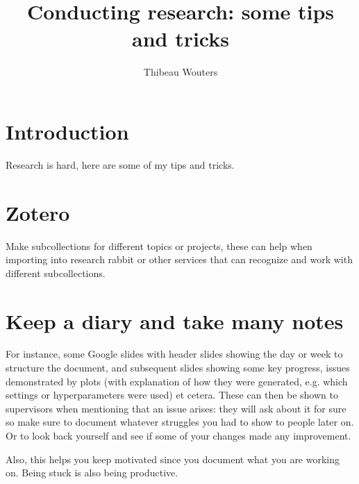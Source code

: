 \documentclass[12pt]{article}
\title{Conducting research: some tips and tricks}
\author{Thibeau Wouters}
\begin{document}
\maketitle


\section{Introduction}

Research is hard, here are some of my tips and tricks.

\section{Zotero}

Make subcollections for different topics or projects, these can help when importing into research rabbit or other services that can recognize and work with different subcollections. 


\section{Keep a diary and take many notes}

For instance, some Google slides with header slides showing the day or week to structure the document, and subsequent slides showing some key progress, issues demonstrated by plots (with explanation of how they were generated, e.g. which settings or hyperparameters were used) et cetera. These can then be shown to supervisors when mentioning that an issue arises: they will ask about it for sure so make sure to document whatever struggles you had to show to people later on. Or to look back yourself and see if some of your changes made any improvement.

Also, this helps you keep motivated since you document what you are working on. Being stuck is also being productive. 

\end{document}
